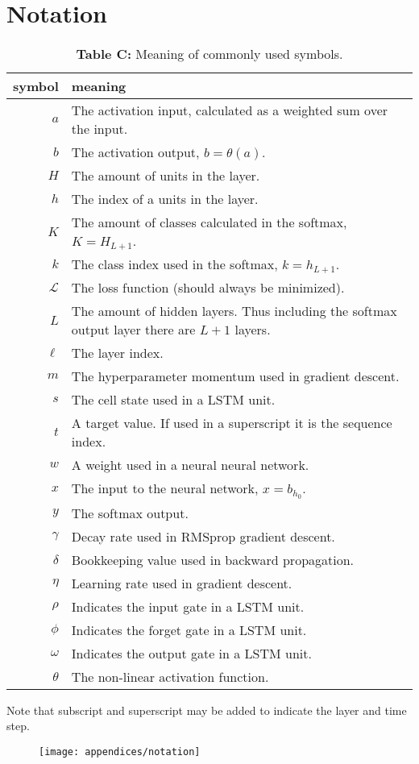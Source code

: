 \chapter{Notation}

\begin{table}[H]
\centering
\begin{tabular}{r p{10cm}}
	symbol & meaning \\ \hline
	$a$ & The activation input, calculated as a weighted sum over the input. \\
	$b$ & The activation output, $b = \theta(a)$. \\
	$H$ & The amount of units in the layer.\\
	$h$ & The index of a units in the layer. \\
	$K$ & The amount of classes calculated in the softmax, $K = H_{L+1}$. \\ 
	$k$ & The class index used in the softmax, $k = h_{L + 1}$.  \\
	$\mathcal{L}$ & The loss function (should always be minimized). \\
	$L$ & The amount of hidden layers. Thus including the softmax output layer there are $L+1$ layers. \\
	$\ell$ & The layer index. \\
	$m$ & The hyperparameter momentum used in gradient descent. \\
	$s$ & The cell state used in a LSTM unit. \\
	$t$ & A target value. If used in a superscript it is the sequence index. \\
	$w$ & A weight used in a neural neural network. \\
	$x$ & The input to the neural network, $x = b_{h_0}$. \\
	$y$ & The softmax output. \\
	$\gamma$ & Decay rate used in RMSprop gradient descent. \\
	$\delta$ & Bookkeeping value used in backward propagation. \\
	$\eta$ & Learning rate used in gradient descent. \\
	$\rho$ & Indicates the input gate in a LSTM unit. \\ 
	$\phi$ & Indicates the forget gate in a LSTM unit. \\ 
	$\omega$ & Indicates the output gate in a LSTM unit. \\ 
	$\theta$ & The non-linear activation function.
\end{tabular}
\caption*{\textbf{Table C:} Meaning of commonly used symbols.}
\end{table}

\vspace{-0.1cm}
Note that subscript and superscript may be added to indicate the layer and time step.
\begin{figure}[H]
	\vspace{-0.2cm}
	\centering
	\texttt{[image: appendices/notation]}
\end{figure}
